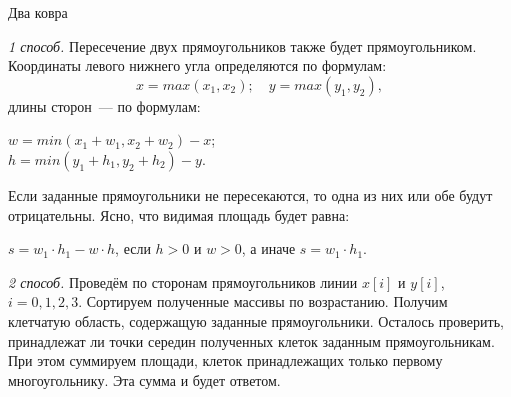 \begin{tutorial}{Два ковра}

\textit{1 способ.} Пересечение двух прямоугольников также будет прямоугольником.  Координаты левого нижнего угла определяются по формулам:
$$x = max(x_1, x_2); \quad y = max(y_1, y_2),$$
длины сторон~--- по формулам:
\begin{center}
$w = min(x_1 + w_1, x_2 + w_2) - x$;\\
$h = min(y_1 + h_1, y_2 + h_2) - y$.
\end{center}
Если заданные прямоугольники не пересекаются, то одна из них или обе будут отрицательны.
Ясно, что видимая  площадь будет равна:
\begin{center}
$s = w_1 \cdot h_1 - w \cdot h$, если $h>0$ и $w>0$, а иначе $s = w_1 \cdot h_1$.
\end{center}


\textit{2 способ.} Проведём по сторонам прямоугольников линии $x[i]$ и $y[i]$, $i = 0,1,2,3$. Сортируем полученные массивы по возрастанию. Получим клетчатую область, содержащую заданные прямоугольники. Осталось проверить, принадлежат ли точки середин полученных клеток заданным прямоугольникам. При этом суммируем площади, клеток принадлежащих только первому многоугольнику. Эта сумма и будет ответом.


\end{tutorial}
